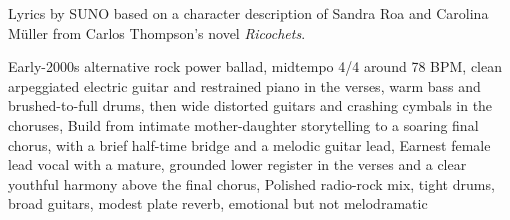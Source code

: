 
\begin{notes}
Lyrics by SUNO based on a character description of Sandra Roa and Carolina Müller %
from Carlos Thompson's novel \emph{Ricochets}.
\end{notes}
\begin{style}
Early-2000s alternative rock power ballad, midtempo 4/4 around 78 BPM, clean arpeggiated electric guitar and restrained piano in the verses, warm bass and brushed-to-full drums, then wide distorted guitars and crashing cymbals in the choruses, Build from intimate mother-daughter storytelling to a soaring final chorus, with a brief half-time bridge and a melodic guitar lead, Earnest female lead vocal with a mature, grounded lower register in the verses and a clear youthful harmony above the final chorus, Polished radio-rock mix, tight drums, broad guitars, modest plate reverb, emotional but not melodramatic
\end{style}
